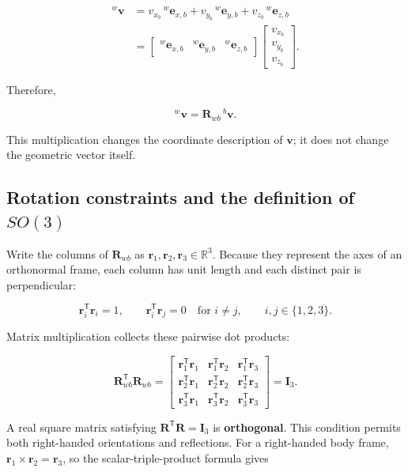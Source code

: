 \documentclass[
  australian,
  12pt,
  letterpaper,
  DIV=11,
  numbers=noendperiod,
  twoside]{scrreprt}
\begin{document}
\[
\begin{aligned}
{}^{w}\mathbf v
&=
v_{x_b}\,{}^{w}\mathbf e_{x,b}
+
v_{y_b}\,{}^{w}\mathbf e_{y,b}
+
v_{z_b}\,{}^{w}\mathbf e_{z,b}\\
&=
\begin{bmatrix}
{}^{w}\mathbf e_{x,b}&
{}^{w}\mathbf e_{y,b}&
{}^{w}\mathbf e_{z,b}
\end{bmatrix}
\begin{bmatrix}
v_{x_b}\\
v_{y_b}\\
v_{z_b}
\end{bmatrix}.
\end{aligned}
\]

Therefore,

\[
\boxed{
{}^{w}\mathbf v
=
\mathbf R_{wb}\,{}^{b}\mathbf v
}.
\]

This multiplication changes the coordinate description of \(\mathbf v\);
it does not change the geometric vector itself.

\subsection{\texorpdfstring{Rotation constraints and the definition of
\(SO(3)\)}{Rotation constraints and the definition of SO(3)}}\label{sec-so3-definition}

Write the columns of \(\mathbf R_{wb}\) as
\(\mathbf r_1,\mathbf r_2,\mathbf r_3\in\mathbb R^3\). Because they
represent the axes of an orthonormal frame, each column has unit length
and each distinct pair is perpendicular:

\[
\mathbf r_i^\mathsf T\mathbf r_i=1,
\qquad
\mathbf r_i^\mathsf T\mathbf r_j=0
\quad\text{for }i\ne j,
\qquad
i,j\in\{1,2,3\}.
\]

Matrix multiplication collects these pairwise dot products:

\[
\mathbf R_{wb}^\mathsf T\mathbf R_{wb}
=
\begin{bmatrix}
\mathbf r_1^\mathsf T\mathbf r_1&
\mathbf r_1^\mathsf T\mathbf r_2&
\mathbf r_1^\mathsf T\mathbf r_3\\
\mathbf r_2^\mathsf T\mathbf r_1&
\mathbf r_2^\mathsf T\mathbf r_2&
\mathbf r_2^\mathsf T\mathbf r_3\\
\mathbf r_3^\mathsf T\mathbf r_1&
\mathbf r_3^\mathsf T\mathbf r_2&
\mathbf r_3^\mathsf T\mathbf r_3
\end{bmatrix}
=
\mathbf I_3.
\]

A real square matrix satisfying
\(\mathbf R^\mathsf T\mathbf R=\mathbf I_3\) is \textbf{orthogonal}.
This condition permits both right-handed orientations and reflections.
For a right-handed body frame,
\(\mathbf r_1\times\mathbf r_2=\mathbf r_3\), so the
scalar-triple-product formula gives
\end{document}
